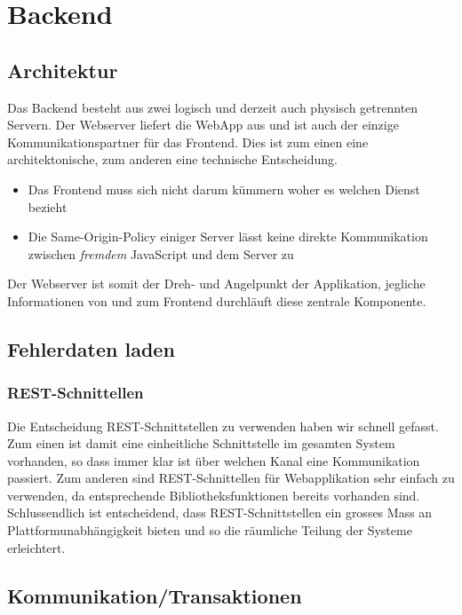 \chapter{Backend}
\label{backend}

\section{Architektur}
Das Backend besteht aus zwei logisch und derzeit auch physisch getrennten Servern. 
Der Webserver liefert die \gls{WebApp} aus und ist auch der einzige Kommunikationspartner für das Frontend. Dies ist zum einen eine architektonische, zum anderen eine technische Entscheidung.

\begin{itemize}
\item Das Frontend muss sich nicht darum kümmern woher es welchen Dienst bezieht
\item Die Same-Origin-Policy\cite{sop} einiger Server lässt keine direkte Kommunikation zwischen \emph{fremdem} JavaScript und dem Server zu
\end{itemize}

Der Webserver ist somit der Dreh- und Angelpunkt der Applikation, jegliche Informationen von und zum Frontend durchläuft diese zentrale Komponente.

\section{Fehlerdaten laden}

\subsection{REST-Schnittellen}
Die Entscheidung \gls{REST}-Schnittstellen zu verwenden haben wir schnell gefasst. 
Zum einen ist damit eine einheitliche Schnittstelle im gesamten System vorhanden, so dass immer klar ist über welchen Kanal eine Kommunikation passiert.
Zum anderen sind \gls{REST}-Schnittellen für Webapplikation sehr einfach zu verwenden, da entsprechende Bibliotheksfunktionen bereits vorhanden sind.
Schlussendlich ist entscheidend, dass \gls{REST}-Schnittstellen ein grosses Mass an Plattformunabhängigkeit bieten und so die räumliche Teilung der Systeme erleichtert.


\section{Kommunikation/Transaktionen}

